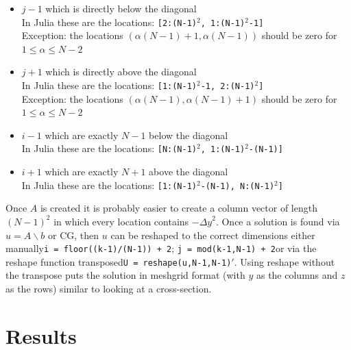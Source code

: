 \documentclass[11pt]{article}
\begin{document}
	\begin{itemize}
		\item $ j-1 $ which is directly below the diagonal\\
		In Julia these are the locations: \texttt{\footnotesize[2:(N-1)$^2$, 1:(N-1)$^2$-1]}\\
		Exception: the locations $ (\alpha(N-1) + 1,\alpha(N-1)) $ should be zero for $ 1\leq\alpha\leq N-2 $
		\item $ j+1 $ which is directly above the diagonal\\
		In Julia these are the locations: \texttt{\footnotesize[1:(N-1)$^2$-1, 2:(N-1)$^2$]}\\
		Exception: the locations $ (\alpha(N-1),\alpha(N-1)+1) $ should be zero for $ 1\leq\alpha\leq N-2 $
		\item $ i-1 $ which are exactly $ N-1 $ below the diagonal\\
		In Julia these are the locations: \texttt{\footnotesize[N:(N-1)$^2$, 1:(N-1)$^2$-(N-1)]}
		\item $ i+1 $ which are exactly $ N+1 $ above the diagonal\\
		In Julia these are the locations: \texttt{\footnotesize[1:(N-1)$^2$-(N-1), N:(N-1)$^2$]}
	\end{itemize}
	Once $ A $ is created it is probably easier to create a column vector of length $ (N-1)^2 $ in which every location contains $ -{\Delta y}^2 $. Once a solution is found via $ u = A\backslash b $ or CG, then $ u $ can be reshaped to the correct dimensions either manually\textemdash \texttt{\footnotesize i = floor((k-1)/(N-1)) + 2}; \texttt{\footnotesize j = mod(k-1,N-1) + 2}\textemdash or via the reshape function transposed\textemdash \texttt{\footnotesize U = reshape(u,N-1,N-1)$'$}. Using reshape without the transpose puts the solution in meshgrid format (with $ y $ as the columns and $ z $ as the rows) similar to looking at a cross-section.\\

	\section{Results}
\end{document}
